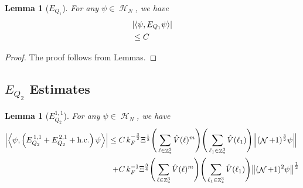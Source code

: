 \documentclass[sn-mathphys, Numbered ,a4paper]{sn-jnl}%
\DeclareMathOperator{\Z}{\mathbb{Z}}
\DeclareMathOperator{\HH}{\mathcal{H}}
\DeclareMathOperator{\NN}{\mathcal{N}}
\newcommand{\half}{\frac{1}{2}}
\newcommand{\eva}[1]{\left\langle #1 \right\rangle}
\theoremstyle{plain}
\newtheorem{lemma}[theorem]{Lemma}
\theoremstyle{definition}
\theoremstyle{remark}
\theoremstyle{plain}
\theoremstyle{definition}
\theoremstyle{remark}
\begin{document}
\begin{lemma}[$E_{Q_1}$]
	For any $\psi \in \HH_N$, we have
	\begin{align}
		&\abs{\eva{\psi, E_{Q_1}  \psi}}\nonumber\\&\leq C
	\end{align}
\end{lemma}
\begin{proof}
	The proof follows from Lemmas.
\end{proof}


\subsection{$E_{Q_2}$ Estimates}
\begin{lemma}[$E_{Q_2}^{1,1}$]
    For any $\psi \in \HH_N$, we have
    \begin{align}
    	\abs{\eva{\psi,\left(E^{\,1,1}_{Q_2}+E^{\,2,1}_{Q_2}+\mathrm{h.c.}\right) \psi }}
    	 \leq \; &C\,  k_{F}^{-\frac{3}{2}} \Xi^\half \Bigg(\sum\limits_{\ell \in \Z^3_*} \hat{V}(\ell)^m\Bigg)\Bigg( \sum\limits_{\ell_1 \in \Z^3_*} \hat{V}(\ell_1) \Bigg) \norm { (\NN+1)^{\frac{3}{2}} \psi }\\
    	 \;+ &C\, k_{F}^{-1}\Xi^{\frac{3}{4}} \Bigg(\sum\limits_{\ell \in \Z^3_*} \hat{V}(\ell)^m\Bigg) \Bigg(\sum\limits_{\ell_1 \in \Z^3_*} \hat{V}(\ell_1) \Bigg)  \norm{ (\NN+1)^2\psi}^\half\label{eq:estEQ211}
    \end{align}
\end{lemma}
\end{document}
